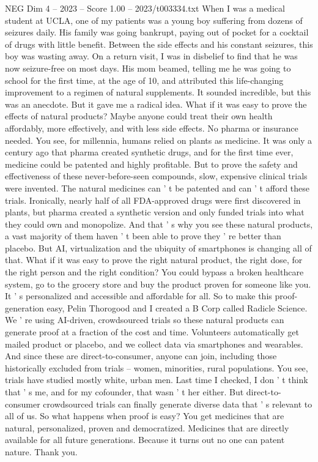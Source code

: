 \begin{textsample}{NEG Dim 4 – 2023 – Score 1.00 – 2023/t003334.txt}  \label{ex:f4_neg_053}
When I was a medical student at UCLA, one of my patients was a young boy suffering from dozens of seizures daily.
His family was going bankrupt, paying out of pocket for a cocktail of drugs with little benefit.
Between the side effects and his constant seizures, this boy was wasting away.
On a return visit, I was in disbelief to find that he was now seizure-free on most days.
His mom beamed, telling me he was going to school for the first time, at the age of 10, and attributed this life-changing improvement to a regimen of natural supplements.
It sounded incredible, but this was an anecdote.
But it gave me a radical idea.
What if it was easy to prove the effects of natural products?
Maybe anyone could treat their own health affordably, more effectively, and with less side effects.
No pharma or insurance needed.
You see, for millennia, humans relied on plants as medicine.
It was only a century ago that pharma created synthetic drugs, and for the first time ever, medicine could be patented and highly profitable.
But to prove the safety and effectiveness of these never-before-seen compounds, slow, expensive clinical trials were invented.
The natural medicines can ' t be patented and can ' t afford these trials.
Ironically, nearly half of all FDA-approved drugs were first discovered in plants, but pharma created a synthetic version and only funded trials into what they could own and monopolize.
And that ' s why you see these natural products, a vast majority of them haven ' t been able to prove they ' re better than placebo.
But AI, virtualization and the ubiquity of smartphones is changing all of that.
What if it was easy to prove the right natural product, the right dose, for the right person and the right condition?
You could bypass a broken healthcare system, go to the grocery store and buy the product proven for someone like you.
It ' s personalized and accessible and affordable for all.
So to make this proof-generation easy, Pelin Thorogood and I created a B Corp called Radicle Science.
We ' re using AI-driven, crowdsourced trials so these natural products can generate proof at a fraction of the cost and time.
Volunteers automatically get mailed product or placebo, and we collect data via smartphones and wearables.
And since these are direct-to-consumer, anyone can join, including those historically excluded from trials -- women, minorities, rural populations.
You see, trials have studied mostly white, urban men.
Last time I checked, I don ' t think that ' s me, and for my cofounder, that wasn ' t her either.
But direct-to-consumer crowdsourced trials can finally generate diverse data that ' s relevant to all of us.
So what happens when proof is easy?
You get medicines that are natural, personalized, proven and democratized.
Medicines that are directly available for all future generations.
Because it turns out no one can patent nature.
Thank you.

\end{textsample}
